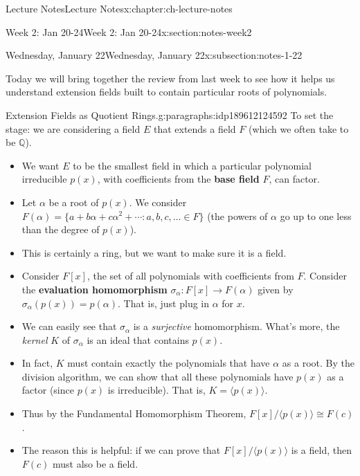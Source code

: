 \documentclass[oneside,11pt,]{book}
\newcommand{\terminology}[1]{\textbf{#1}}
\newcommand{\Q}{\mathbb{Q}}
\newcommand{\st}{:}
\begin{document}
\begin{chapterptx}{Lecture Notes}{}{Lecture Notes}{}{}{x:chapter:ch-lecture-notes}
\begin{sectionptx}{Week 2: Jan 20-24}{}{Week 2: Jan 20-24}{}{}{x:section:notes-week2}
%
%
\typeout{************************************************}
\typeout{************************************************}
%
\begin{subsectionptx}{Wednesday, January 22}{}{Wednesday, January 22}{}{}{x:subsection:notes-1-22}
\begin{introduction}{}%
Today we will bring together the review from last week to see how it helps us understand extension fields built to contain particular roots of polynomials.%
\end{introduction}%
\begin{paragraphs}{Extension Fields as Quotient Rings.}{g:paragraphs:idp189612124592}%
To set the stage: we are considering a field \(E\) that extends a field \(F\) (which we often take to be \(\Q\)).%
\begin{itemize}[label=\textbullet]
\item{}We want \(E\) to be the smallest field in which a particular polynomial irreducible \(p(x)\), with coefficients from the \terminology{base field} \(F\), can factor.%
\item{}Let \(\alpha\) be a root of \(p(x)\).  We consider \(F(\alpha) = \{a+b\alpha + c \alpha^2 + \cdots \st a, b, c,\ldots \in F\}\) (the powers of \(\alpha\) go up to one less than the degree of \(p(x)\)).%
\item{}This is certainly a ring, but we want to make sure it is a field.%
\item{}Consider \(F[x]\), the set of all polynomials with coefficients from \(F\).  Consider the \terminology{evaluation homomorphism} \(\sigma_\alpha:F[x] \to F(\alpha)\) given by \(\sigma_\alpha(p(x)) = p(\alpha)\).   That is, just plug in \(\alpha\) for \(x\).%
\item{}We can easily see that \(\sigma_\alpha\) is a \emph{surjective} homomorphism.  What's more, the \emph{kernel} \(K\) of \(\sigma_\alpha\) is an ideal that contains \(p(x)\).%
\item{}In fact, \(K\) must contain exactly the polynomials that have \(\alpha\) as a root.  By the division algorithm, we can show that all these polynomials have \(p(x)\) as a factor (since \(p(x)\) is irreducible).  That is, \(K = \langle p(x) \rangle\).%
\item{}Thus by the Fundamental Homomorphism Theorem, \(F[x]/\langle p(x) \rangle \cong F(c)\).%
\item{}The reason this is helpful: if we can prove that \(F[x]/\langle p(x) \rangle\) is a field, then \(F(c)\) must also be a field.%

\end{itemize}
\end{paragraphs}
\end{subsectionptx}
\end{sectionptx}
\end{chapterptx}
\end{document}
